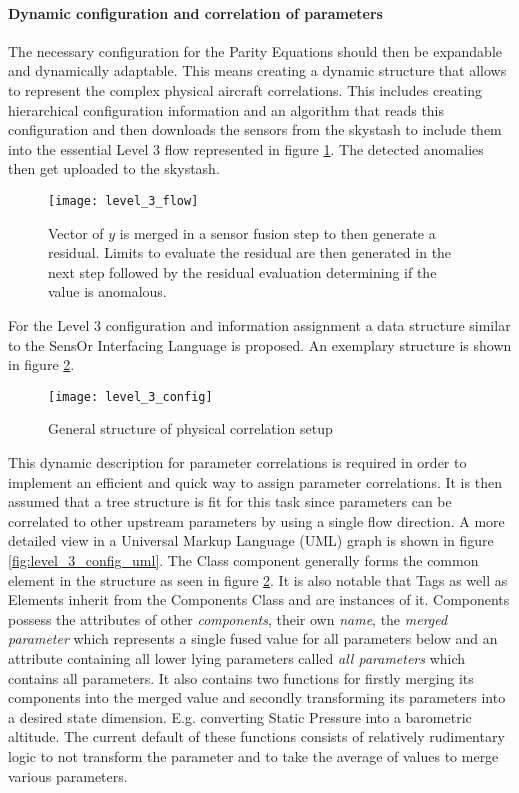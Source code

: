 \paragraph{Dynamic configuration and correlation of parameters}

The necessary configuration for the Parity Equations should then be expandable and dynamically adaptable. This means creating a dynamic structure that allows to represent the complex physical aircraft correlations. This includes creating hierarchical configuration information and an algorithm that reads this configuration and then downloads the sensors from the skystash to include them into the essential Level 3 flow represented in figure \ref{fig:level_3_flow}. The detected anomalies then get uploaded to the skystash.

\begin{figure}
    \centering
    \texttt{[image: level\_3\_flow]}
    \caption{Vector of $y$ is merged in a sensor fusion step to then generate a residual. Limits to evaluate the residual are then generated in the next step followed by the residual evaluation determining if the value is anomalous.}
    \label{fig:level_3_flow}
\end{figure}

For the Level 3 configuration and information assignment a data structure similar to the SensOr Interfacing Language is proposed. An exemplary structure is shown in figure \ref{fig:level_3_config}.
\begin{figure}
    \centering
    \texttt{[image: level\_3\_config]}
    \caption{General structure of physical correlation setup}
    \label{fig:level_3_config}
\end{figure}

This dynamic description for parameter correlations is required in order to implement an efficient and quick way to assign parameter correlations. It is then assumed that a tree structure is fit for this task since parameters can be correlated to other upstream parameters by using a single flow direction. A more detailed view in a Universal Markup Language (UML) graph is shown in figure \ref{fig:level_3_config_uml}. The Class component generally forms the common element in the structure as seen in figure \ref{fig:level_3_config}. It is also notable that Tags as well as Elements inherit from the Components Class and are instances of it. Components possess the attributes of other \textit{components}, their own \textit{name}, the \textit{merged parameter} which represents a single fused value for all parameters below and an attribute containing all lower lying parameters called \textit{all parameters} which contains all parameters. It also contains two functions for firstly merging its components into the merged value and secondly transforming its parameters into a desired state dimension. E.g. converting Static Pressure into a barometric altitude. The current default of these functions consists of relatively rudimentary logic to not transform the parameter and to take the average of values to merge various parameters.

